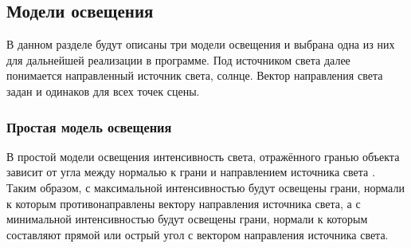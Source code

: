 



\subsection{Модели освещения}

В данном разделе будут описаны три модели освещения и выбрана одна из них для дальнейшей реализации в программе.
Под источником света далее понимается направленный источник света, солнце.
Вектор направления света задан и одинаков для всех точек сцены.

\subsubsection{Простая модель освещения}

В простой модели освещения интенсивность света, отражённого гранью объекта зависит от угла между нормалью к грани и направлением источника света \cite{aoaoa}.
Таким образом, с максимальной интенсивностью будут освещены грани, нормали к которым противонаправлены вектору направления источника света, а с минимальной интенсивностью будут освещены грани, нормали к которым составляют прямой или острый угол с вектором направления источника света.

